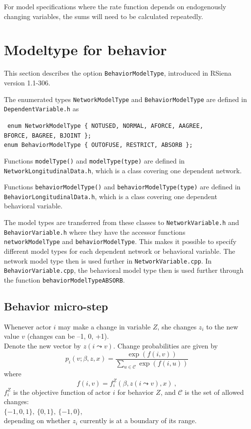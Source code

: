 \documentclass[a4paper,12pt,fleqn]{article}
\begin{document}
For model specifications where the rate function depends on endogenously
changing variables, the sums will need to be calculated repeatedly.

\section{Modeltype for behavior}

This section describes the option \texttt{BehaviorModelType},
introduced in RSiena version 1.1-306.


The enumerated types  \texttt{NetworkModelType} and
\texttt{BehaviorModelType} are defined
in \texttt{DependentVariable.h} as

\noindent
\texttt{\small
enum NetworkModelType \{ NOTUSED, NORMAL, AFORCE, AAGREE,\\
\hspace{8em}                         BFORCE, BAGREE, BJOINT \};\\
enum BehaviorModelType \{ OUTOFUSE, RESTRICT, ABSORB \};
}

Functions \texttt{modelType()} and \texttt{modelType(type)}
are defined in  \\
\texttt{NetworkLongitudinalData.h},
which is a class covering one dependent network.

Functions \texttt{behaviorModelType()} and \texttt{behaviorModelType(type)}
are defined in
\texttt{BehaviorLongitudinalData.h},
which is a class covering one dependent behavioral variable.

The model types are transferred from these classes
to \texttt{NetworkVariable.h} and \texttt{BehaviorVariable.h}
where they have the accessor functions\\
\texttt{networkModelType} and
\texttt{behaviorModelType}.
This makes it possible to specify different model types
for each dependent network or behavioral variable.
The network model type then is used further in
\texttt{NetworkVariable.cpp}.
In  \texttt{BehaviorVariable.cpp}, the behavioral model type
then is used further through the function \texttt{behaviorModelTypeABSORB}.

\subsection{Behavior micro-step}
Whenever actor $i$ may make a change in variable $Z$,
she changes $z_{i}$ to the new value $v$ (changes can be --1, 0, +1). \\
Denote the new vector by $z(i \leadsto v)$.
Change probabilities are given by\\
\[
p_{i}(v; \beta, z, x) = \frac{\exp(f(i,v))}
             {\displaystyle \sum_{u \in \mathcal C} \exp(f(i,u))}
\]
where
\[
f(i,v) = f^{Z}_i(\beta, z(i \leadsto v), x) \ ,
\]
$f_i^Z$ is the objective function of actor $i$ for behavior $Z$,
and $\mathcal C$ is the set of allowed changes:\\
$\{-1,0,1\}, \ \{0,1\}, \ \{-1,0\}$, \\
depending on whether $z_i$ currently is at a boundary of its range.
\end{document}
